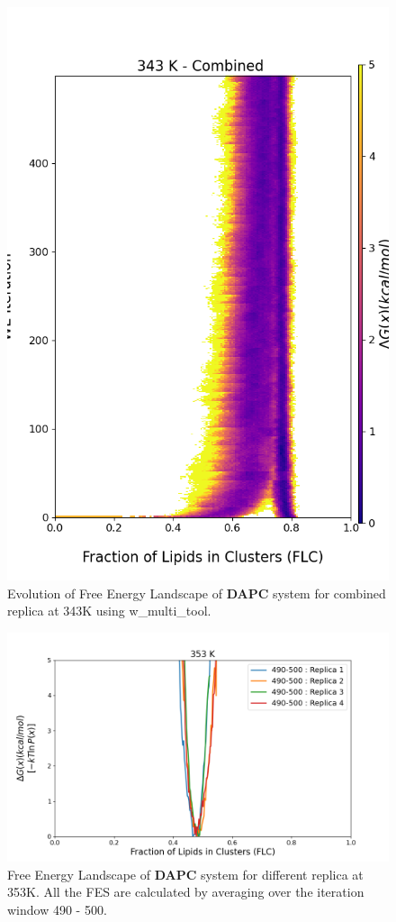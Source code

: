 \documentclass{biophys-new}
\begin{document}
\begin{figure}[hbt!]
\centering
\includegraphics[width=0.8\linewidth]{all_plots/ClusterLipids2Total/DPPC_DAPC_CHOL/343K/Evolution_DAPC_MULTI__343_ClusterLipids2Total.png}
\caption{Evolution of Free Energy Landscape of \textbf{DAPC} system for combined replica at 343K using w\_multi\_tool.}
\label{fig:view}

\end{figure}


\begin{figure}[hbt!]
\centering
\includegraphics[width=1.1\linewidth]{all_plots/ClusterLipids2Total/DPPC_DAPC_CHOL/353K/Average_DAPC_353_ClusterLipids2Total.png}
\caption{Free Energy Landscape of \textbf{DAPC} system for different replica at 353K. All the FES are calculated by averaging over the iteration window 490 - 500.}
\label{fig:view}

\end{figure}
\end{document}
